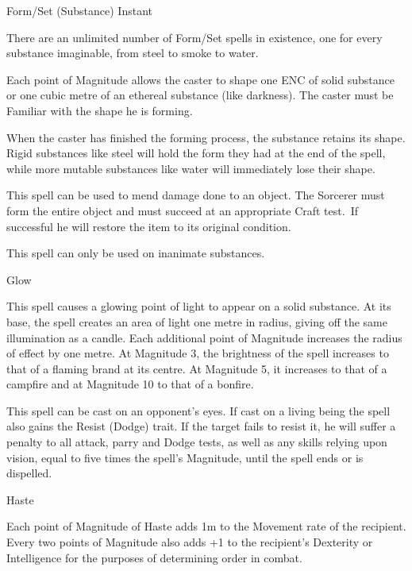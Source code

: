 \begin{samepage}
\begin{rpg-spell}
{Form/Set (Substance)}
{Instant}

There are an unlimited number of Form/Set spells in existence, one for every substance imaginable, from steel to smoke to water. 

Each point of Magnitude allows the caster to shape one ENC of solid substance or one cubic metre of an ethereal substance (like darkness). The caster must be Familiar with the shape he is forming. 

When the caster has finished the forming process, the substance retains its shape. Rigid substances like steel will hold the form they had at the end of the spell, while more mutable substances like water will immediately lose their shape. 

This spell can be used to mend damage done to an object. The Sorcerer must form the entire object and must succeed at an appropriate Craft test. If successful he will restore the item to its original condition. 

This spell can only be used on inanimate substances. 
\end{rpg-spell}
\end{samepage}


\begin{samepage}
\begin{rpg-spell}
{Glow}
{}

This spell causes a glowing point of light to appear on a solid substance. At its base, the spell creates an area of light one metre in radius, giving off the same illumination as a candle. Each additional point of Magnitude increases the radius of effect by one metre. At Magnitude 3, the brightness of the spell increases to that of a flaming brand at its centre. At Magnitude 5, it increases to that of a campfire and at Magnitude 10 to that of a bonfire. 

This spell can be cast on an opponent’s eyes. If cast on a living being the spell also gains the Resist (Dodge) trait. If the target fails to resist it, he will suffer a penalty to all attack, parry and Dodge tests, as well as any skills relying upon vision, equal to five times the spell’s Magnitude, until the spell ends or is dispelled. 
\end{rpg-spell}
\end{samepage}


\begin{samepage}
\begin{rpg-spell}
{Haste}
{}

Each point of Magnitude of Haste adds 1m to the Movement rate of the recipient. Every two points of Magnitude also adds +1 to the recipient’s Dexterity or Intelligence for the purposes of determining order in combat. 
\end{rpg-spell}
\end{samepage}


